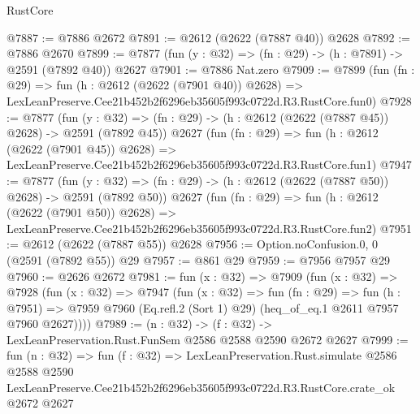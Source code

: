 \begin{lexlean}{RustCore}
\begin{coremodule}
@7887 := @7886 @2672
@7891 := @2612 (@2622 (@7887 @40)) @2628
@7892 := @7886 @2670
@7899 := @7877 (fun (y : @32) => (fn : @29) -> (h : @7891) -> @2591 (@7892 @40)) @2627
@7901 := @7886 Nat.zero
@7909 := @7899
    (fun (fn : @29) =>
    fun (h : @2612 (@2622 (@7901 @40)) @2628) =>
    LexLeanPreserve.Cee21b452b2f6296eb35605f993c0722d.R3.RustCore.fun0)
@7928 := @7877
    (fun (y : @32) => (fn : @29) -> (h : @2612 (@2622 (@7887 @45)) @2628) -> @2591 (@7892 @45))
    @2627
    (fun (fn : @29) =>
    fun (h : @2612 (@2622 (@7901 @45)) @2628) =>
    LexLeanPreserve.Cee21b452b2f6296eb35605f993c0722d.R3.RustCore.fun1)
@7947 := @7877
    (fun (y : @32) => (fn : @29) -> (h : @2612 (@2622 (@7887 @50)) @2628) -> @2591 (@7892 @50))
    @2627
    (fun (fn : @29) =>
    fun (h : @2612 (@2622 (@7901 @50)) @2628) =>
    LexLeanPreserve.Cee21b452b2f6296eb35605f993c0722d.R3.RustCore.fun2)
@7951 := @2612 (@2622 (@7887 @55)) @2628
@7956 := Option.noConfusion.{0, 0} (@2591 (@7892 @55)) @29
@7957 := @861 @29
@7959 := @7956 @7957 @29
@7960 := @2626 @2672
@7981 := fun (x : @32) =>
  @7909
    (fun (x : @32) =>
    @7928
      (fun (x : @32) =>
      @7947
        (fun (x : @32) =>
        fun (fn : @29) =>
        fun (h : @7951) =>
        @7959 @7960 (Eq.refl.{2} (Sort 1) @29) (heq_of_eq.{1} @2611 @7957 @7960 @2627))))
@7989 := (n : @32) -> (f : @32) -> LexLeanPreservation.Rust.FunSem @2586 @2588 @2590 @2672 @2627
@7999 := fun (n : @32) =>
  fun (f : @32) =>
  LexLeanPreservation.Rust.simulate
    @2586
    @2588
    @2590
    LexLeanPreserve.Cee21b452b2f6296eb35605f993c0722d.R3.RustCore.crate_ok
    @2672
    @2627
\end{coremodule}
\end{lexlean}
